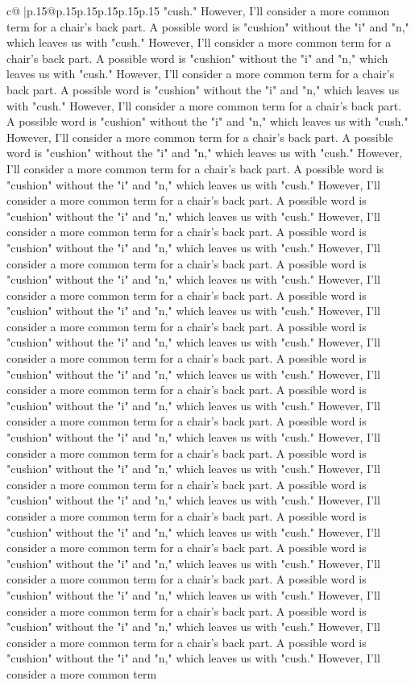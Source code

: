 \documentclass{article}
\begin{document}
{\begin{supertabular}{c@{$\;$}|p{.15\linewidth}@{}p{.15\linewidth}p{.15\linewidth}p{.15\linewidth}p{.15\linewidth}p{.15\linewidth}}
{{{"cush." However, I'll consider a more common term for a chair's back part. A possible word is "cushion" without the "i" and "n," which leaves us with "cush." However, I'll consider a more common term for a chair's back part. A possible word is "cushion" without the "i" and "n," which leaves us with "cush." However, I'll consider a more common term for a chair's back part. A possible word is "cushion" without the "i" and "n," which leaves us with "cush." However, I'll consider a more common term for a chair's back part. A possible word is "cushion" without the "i" and "n," which leaves us with "cush." However, I'll consider a more common term for a chair's back part. A possible word is "cushion" without the "i" and "n," which leaves us with "cush." However, I'll consider a more common term for a chair's back part. A possible word is "cushion" without the "i" and "n," which leaves us with "cush." However, I'll consider a more common term for a chair's back part. A possible word is "cushion" without the "i" and "n," which leaves us with "cush." However, I'll consider a more common term for a chair's back part. A possible word is "cushion" without the "i" and "n," which leaves us with "cush." However, I'll consider a more common term for a chair's back part. A possible word is "cushion" without the "i" and "n," which leaves us with "cush." However, I'll consider a more common term for a chair's back part. A possible word is "cushion" without the "i" and "n," which leaves us with "cush." However, I'll consider a more common term for a chair's back part. A possible word is "cushion" without the "i" and "n," which leaves us with "cush." However, I'll consider a more common term for a chair's back part. A possible word is "cushion" without the "i" and "n," which leaves us with "cush." However, I'll consider a more common term for a chair's back part. A possible word is "cushion" without the "i" and "n," which leaves us with "cush." However, I'll consider a more common term for a chair's back part. A possible word is "cushion" without the "i" and "n," which leaves us with "cush." However, I'll consider a more common term for a chair's back part. A possible word is "cushion" without the "i" and "n," which leaves us with "cush." However, I'll consider a more common term for a chair's back part. A possible word is "cushion" without the "i" and "n," which leaves us with "cush." However, I'll consider a more common term for a chair's back part. A possible word is "cushion" without the "i" and "n," which leaves us with "cush." However, I'll consider a more common term for a chair's back part. A possible word is "cushion" without the "i" and "n," which leaves us with "cush." However, I'll consider a more common term for a chair's back part. A possible word is "cushion" without the "i" and "n," which leaves us with "cush." However, I'll consider a more common term for a chair's back part. A possible word is "cushion" without the "i" and "n," which leaves us with "cush." However, I'll consider a more common term for a chair's back part. A possible word is "cushion" without the "i" and "n," which leaves us with "cush." However, I'll consider a more common term }}}
\end{supertabular}}
\end{document}
